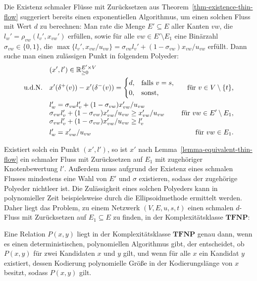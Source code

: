 Die Existenz schmaler Flüsse mit Zurücksetzen aus Theorem~\ref{thm-existence-thin-flow} suggeriert bereits einen exponentiellen Algorithmus, um einen solchen Fluss mit Wert $d$ zu berechnen:
Man rate die Menge $E'\subseteq E$ aller Kanten $vw$, die $l_w' = \rho_{vw}(l_v', x_{vw}')$ erfüllen, sowie für alle $vw\in E'\setminus E_1$ eine Binärzahl $\sigma_{vw}\in\{0,1\}$, die $\max\{ l_v', x_{vw}/u_{vw}\} = \sigma_{vw} l_v' + (1-\sigma_{vw}) x_{vw}/u_{vw}$ erfüllt.
Dann suche man einen zulässigen Punkt in folgendem Polyeder:
\begin{align*}
&	(x', l') \in \R_{\geq 0}^{E'\times V} \\
	\text{u.d.N.}\quad &
	x'(\delta^+(v)) - x'(\delta^-(v)) =
		\begin{cases}
			d, & \text{falls $v=s$},\\
			0, & \text{sonst,} 
		\end{cases} & \text{für $v\in V\setminus\{t \}$,} \\
	& \begin{array}{@{}l}
		l_w' = \sigma_{vw} l_v' + (1-\sigma_{vw}) x'_{vw}/u_{vw}\\
		\sigma_{vw} l_v' + (1-\sigma_{vw}) x'_{vw}/u_{vw} \geq x'_{vw}/u_{vw}\\
		\sigma_{vw} l_v' + (1-\sigma_{vw}) x'_{vw}/u_{vw} \geq l_v'
	\end{array}
	& \text{für $vw\in E'\setminus E_1$},\\
	& l_w' = x'_{vw}/u_{vw} & \text{für $vw\in E_1$.}
\end{align*}

\newcommand{\TFNP}{\mathbf{TFNP}}

Existiert solch ein Punkt $(x', l')$, so ist $x'$ nach Lemma~\ref{lemma-equivalent-thin-flow} ein schmaler Fluss mit Zurücksetzen auf $E_1$ mit zugehöriger Knotenbewertung $l'$.
Außerdem muss aufgrund der Existenz eines schmalen Flusses mindestens eine Wahl von $E'$ und $\sigma$ existieren, sodass der zugehörige Polyeder nichtleer ist.
Die Zulässigkeit eines solchen Polyeders kann in polynomieller Zeit beispielsweise durch die Ellipsoidmethode ermittelt werden. 
Daher liegt das Problem, zu einem Netzwerk $(V, E, u, s, t)$ einen schmalen $d$-Fluss mit Zurücksetzen auf $E_1\subseteq E$ zu finden, in der Komplexitätsklasse $\TFNP$:

\begin{definition}[Komplexitätsklasse $\TFNP$]
	Eine Relation $P(x,y)$ liegt in der Komplexitätsklasse $\TFNP$ genau dann, wenn es einen deterministischen, polynomiellen Algorithmus gibt, der entscheidet, ob $P(x,y)$ für zwei Kandidaten $x$ und $y$ gilt, und wenn für alle $x$ ein Kandidat $y$ existiert, dessen Kodierung polynomielle Größe in der Kodierungslänge von $x$ besitzt, sodass $P(x, y)$ gilt.
\end{definition}

